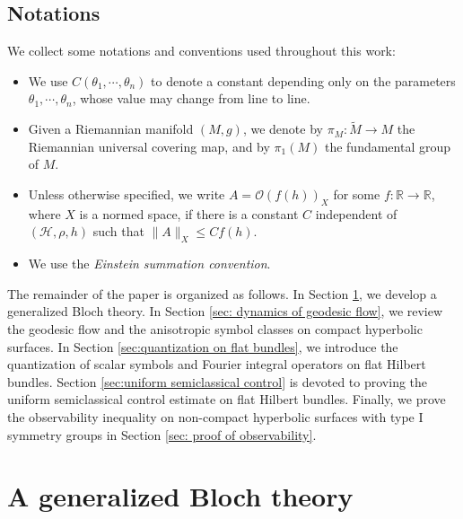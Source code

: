 \documentclass[11pt,oneside,reqno]{amsart}
\newcommand\R{\ensuremath{\mathbb{R}}}
\theoremstyle{definition}
\numberwithin{equation}{section}
\theoremstyle{plain}
\begin{document}






\subsection{Notations}

We collect some notations and conventions used throughout this work:
\begin{itemize}
\item We use $C(\theta_1,\cdots,\theta_n)$ to denote a constant depending only on the parameters $\theta_1,\cdots,\theta_n$, whose value may change from line to line.
\item Given a Riemannian manifold $(M,g)$, we denote by $\pi_M:\widetilde{M} \rightarrow M$ the Riemannian universal covering map, and by $\pi_1(M)$ the fundamental group of $M$.
\item Unless otherwise specified, we write $A=\mathcal{O}(f(h))_X$ for some $f:\R\rightarrow \R$, where $X$ is a normed space, if there is a constant $C$ independent of $(\mathcal{H},\rho,h)$ such that $\|A\|_X \leq Cf(h)$.
\item We use the \emph{Einstein summation convention}.
\end{itemize}


The remainder of the paper is organized as follows. In Section \ref{sec:bloch theory}, we develop a generalized Bloch theory. In Section \ref{sec: dynamics of geodesic flow}, we review the geodesic flow and the anisotropic symbol classes on compact hyperbolic surfaces. In Section \ref{sec:quantization on flat bundles}, we introduce the quantization of scalar symbols and Fourier integral operators on flat Hilbert bundles. Section \ref{sec:uniform semiclassical control} is devoted to proving the uniform semiclassical control estimate on flat Hilbert bundles. Finally, we prove the observability inequality on non-compact hyperbolic surfaces with type I symmetry groups in Section \ref{sec: proof of observability}.




\section{A generalized Bloch theory}\label{sec:bloch theory}
\end{document}
